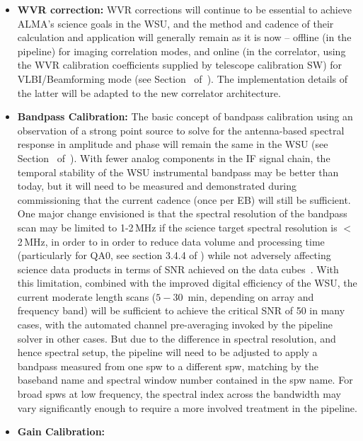 \begin{itemize}
\item {\bf WVR correction:}
WVR corrections will continue to be essential to achieve ALMA's science goals in the WSU, and the method and cadence of their calculation and application will generally remain as it is now -- offline (in the pipeline) for imaging correlation modes, and online (in the correlator, using the WVR calibration coefficients supplied by telescope calibration SW) for VLBI/Beamforming mode (see 
Section~\offlineCalibration\/ of~\cite{CSA-IA}).  The implementation details of the latter will be adapted to the new correlator architecture.
\item{\bf Bandpass Calibration:} 
The basic concept of bandpass calibration using an observation of a strong point source
to solve for the antenna-based spectral response in amplitude and phase will
remain the same in the WSU (see Section~\offlineCalibration\/ of~\cite{CSA-IA}).  With fewer analog components in the IF signal
chain, the temporal stability of the WSU instrumental bandpass may
be better than today, but it will need to be measured and demonstrated 
during commissioning that the current cadence (once per EB) will still be sufficient.  
One major change envisioned is that the spectral resolution of the bandpass scan may be limited to 1-2\,MHz if the science target spectral resolution is $<$2\,MHz, in order to
in order to reduce data volume and processing time (particularly for QA0, see section 3.4.4 of \cite{da}) while not adversely affecting science data products in terms of SNR achieved on the data cubes~\cite{bandpassMemo}.  With this 
limitation, combined with the improved digital efficiency of the WSU, the current moderate length scans ($5-30$~min, depending on array and frequency band) will be sufficient to achieve the critical SNR of 50 in many cases, with the automated channel pre-averaging invoked  by the pipeline solver in other cases.  But due to the difference in spectral resolution, and hence spectral setup, the pipeline will need to be adjusted to apply a bandpass measured from one spw to a different spw, matching by the baseband name and spectral window number contained in the spw name.  For broad spws at low frequency, the spectral index across the bandwidth may vary significantly enough to require a more involved treatment in the pipeline.
\item{\bf Gain Calibration:}

\end{itemize}
